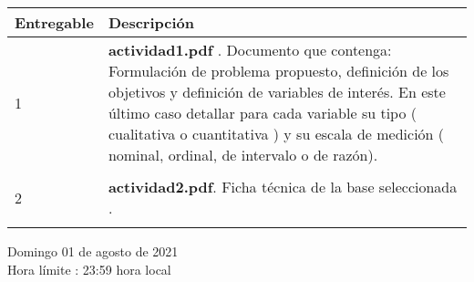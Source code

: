 \documentclass[base=hide,11pt]{elegantbook}
\begin{document}
\begin{tabular}{lp{12cm}}
{\bf Entregable } & {\bf Descripción} \\
\hline 
1& \textcolor{col3}{\bf actividad1.pdf} .\hspace{.5cm} Documento que contenga: Formulación de problema propuesto, definición  de los objetivos y definición de variables de interés. En este último caso detallar para cada variable su  tipo ( cualitativa o cuantitativa ) y su escala de medición ( nominal, ordinal, de intervalo o de razón).\\
&\\
\hline
2&  \textcolor{col3}{\bf actividad2.pdf}.\hspace{.5cm}  Ficha técnica de  la base seleccionada .\\
&\\
\hline
\end{tabular}
\vspace{1cm}

Domingo 01 de agosto de 2021\\
Hora límite : 23:59  hora  local



\end{document}
